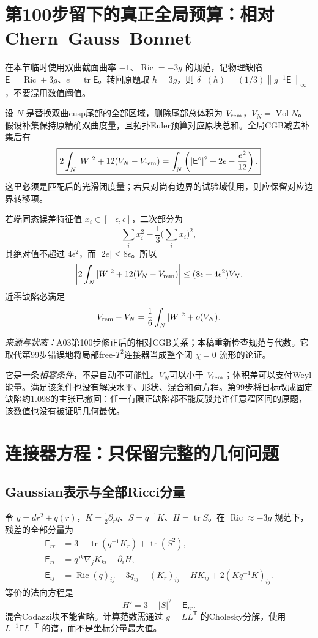 \documentclass[UTF8,a4paper,11pt,fontset=fandol]{ctexart}
\numberwithin{equation}{section}
\theoremstyle{definition}
\newcommand{\Ric}{\operatorname{Ric}}
\newcommand{\Vol}{\operatorname{Vol}}
\newcommand{\tr}{\operatorname{tr}}
\newcommand{\norm}[1]{\left\lVert#1\right\rVert}
\newcommand{\source}[1]{\par\noindent\textit{来源与状态：}#1\par}
\begin{document}
\section{第100步留下的真正全局预算：相对Chern--Gauss--Bonnet}
在本节临时使用双曲截面曲率 $-1$、$\Ric=-3g$ 的规范，记物理缺陷 $\mathsf E=\Ric+3g$、$e=\tr\mathsf E$。转回原题取 $h=3g$，则 $\delta_-(h)=(1/3)\norm{g^{-1}\mathsf E}_\infty$，不要混用数值阈值。

设 $N$ 是替换双曲cusp尾部的全部区域，删除尾部总体积为 $V_{\rm rem}$，$V_N=\Vol N$。假设补集保持原精确双曲度量，且拓扑Euler预算对应原块总和。全局CGB减去补集后有
\begin{equation}\label{eq:relative}
\boxed{
2\int_N|W|^2+12(V_N-V_{\rm rem})
=\int_N\left(|\mathsf E^\circ|^2+2e-\frac{e^2}{12}\right).}
\end{equation}
这里必须是匹配后的光滑闭度量；若只对尚有边界的试验域使用，则应保留对应边界转移项。

若端同态误差特征值 $x_i\in[-\epsilon,\epsilon]$，二次部分为
\[
\sum_i x_i^2-\frac13\Big(\sum_i x_i\Big)^2,
\]
其绝对值不超过 $4\epsilon^2$，而 $|2e|\le8\epsilon$。所以
\begin{equation}\label{eq:relativebound}
\left|2\int_N|W|^2+12(V_N-V_{\rm rem})\right|
\le(8\epsilon+4\epsilon^2)V_N.
\end{equation}
近零缺陷必满足
\[
V_{\rm rem}-V_N=\frac16\int_N|W|^2+o(V_N).
\]
\source{A03第100步修正后的相对CGB关系；本稿重新检查规范与代数。它取代第99步错误地将局部free-$T^2$连接器当成整个闭 $\chi=0$ 流形的论证。}

它是一条\emph{相容条件}，不是自动不可能性。$V_N$可以小于 $V_{\rm rem}$；体积差可以支付Weyl能量。满足该条件也没有解决水平、形状、混合和荷方程。第99步将目标改成固定缺陷约1.098的主张已撤回：任一有限正缺陷都不能反驳允许任意窄区间的原题，该数值也没有被证明几何最优。

\section{连接器方程：只保留完整的几何问题}
\subsection{Gaussian表示与全部Ricci分量}
令 $g=dr^2+q(r)$，$K=\frac12\partial_rq$、$S=q^{-1}K$、$H=\tr S$。在 $\Ric\approx-3g$ 规范下，残差的全部分量为
\begin{align}
\mathsf E_{rr}&=3-\tr(q^{-1}K_r)+\tr(S^2),\\
\mathsf E_{ri}&=q^{jk}\nabla_jK_{ki}-\partial_iH,\\
\mathsf E_{ij}&=\Ric(q)_{ij}+3q_{ij}-(K_r)_{ij}-HK_{ij}
+2(Kq^{-1}K)_{ij}.\label{eq:fullRic}
\end{align}
等价的法向方程是
\[
H'=3-|S|^2-\mathsf E_{rr}.
\]
混合Codazzi块不能省略。计算范数需通过 $g=LL^{\mathsf T}$ 的Cholesky分解，使用 $L^{-1}\mathsf E L^{-\mathsf T}$ 的谱，而不是坐标分量最大值。
\end{document}
